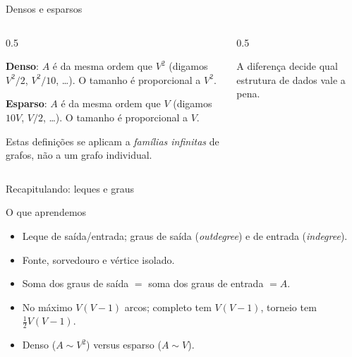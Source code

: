 \documentclass[aspectratio=169]{beamer}
\begin{document}
\begin{frame}{Densos e esparsos}
  \begin{columns}[T]
    \begin{column}{0.5\textwidth}
      {\small
      \textbf{Denso}: $A$ é da mesma ordem que $V^2$
      (digamos $V^2/2$, $V^2/10$, \dots). O tamanho é proporcional a $V^2$.

      \medskip
      \textbf{Esparso}: $A$ é da mesma ordem que $V$
      (digamos $10V$, $V/2$, \dots). O tamanho é proporcional a $V$.

      \medskip
      {\scriptsize Estas definições se aplicam a \emph{famílias infinitas} de
      grafos, não a um grafo individual.}}
    \end{column}
    \begin{column}{0.5\textwidth}
      \begin{center}
      \end{center}
      {\scriptsize A diferença decide qual estrutura de dados vale a pena.}
    \end{column}
  \end{columns}
\end{frame}

\begin{frame}{Recapitulando: leques e graus}
  \begin{block}{O que aprendemos}
    \begin{itemize}\small
      \item Leque de saída/entrada; graus de saída (\emph{outdegree}) e de entrada (\emph{indegree}).
      \item Fonte, sorvedouro e vértice isolado.
      \item Soma dos graus de saída $=$ soma dos graus de entrada $= A$.
      \item No máximo $V(V-1)$ arcos; completo tem $V(V-1)$, torneio tem $\tfrac{1}{2}V(V-1)$.
      \item Denso ($A \sim V^2$) versus esparso ($A \sim V$).
    \end{itemize}
  \end{block}
\end{frame}
\end{document}
